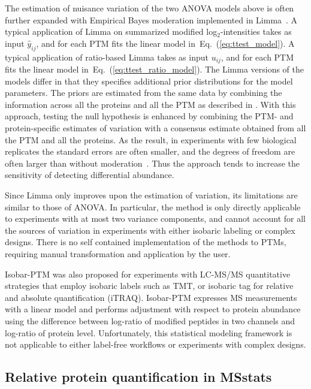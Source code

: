 \documentclass[mcp]{article}
\numberwithin{table}{section}
\def\eqref#1{Eq.~(\ref{eq:#1})}
\begin{document}
\medskip \noindent The estimation of nuisance variation of the two ANOVA models above is often further expanded with Empirical Bayes moderation implemented in Limma~\cite{ Ritchie_15a, Schwammle2015, Smyth:2004, Smyth:2005, Zhu,Chappell:2021}. 
A typical application of Limma on summarized modified log$_2$-intensities takes as input $\hat{y}_{ij}$, and for each PTM fits the linear model in~\eqref{ttest_model}. 
A typical application of ratio-based Limma takes as input $u_{ij}$, and for each PTM fits the linear model in~\eqref{ttest_ratio_model}. 
The Limma versions of the models differ in that they specifies additional prior distributions for the model parameters. 
The priors are estimated from the same data by combining the information across all the proteins and all the PTM as described in \cite{Smyth:2004}. 
With this approach, testing the null hypothesis is enhanced by combining the PTM- and protein-specific estimates of variation with a consensus estimate obtained from all the PTM and all the proteins.
As the result, in experiments with few biological replicates the standard errors are often smaller, and the degrees of freedom are often larger than without moderation~\cite{Ritchie_15a}. 
Thus the approach tends to increase the sensitivity of detecting differential abundance.

Since Limma only improves upon the estimation of variation, its limitations are similar to those of ANOVA. In particular, the method is only directly applicable to experiments with at most two variance components, and cannot account for all the sources of variation in experiments with either isobaric labeling or complex designs. There is no self contained implementation of the methods to PTMs, requiring manual transformation and application by the user.

\medskip {} 

\medskip \noindent Isobar-PTM was also proposed for experiments with LC-MS/MS quantitative strategies that employ isobaric labels such as TMT, or isobaric tag for relative and absolute quantification (iTRAQ)\cite{Breitwieser:2013}. Isobar-PTM expresses MS measurements with a linear model and performs adjustment with respect to protein abundance using the difference between log-ratio of modified peptides in two channels and log-ratio of protein level. Unfortunately, this statistical modeling framework is not applicable to either label-free workflows or experiments with complex designs. 


\subsection*{Relative protein quantification in MSstats}
\end{document}
